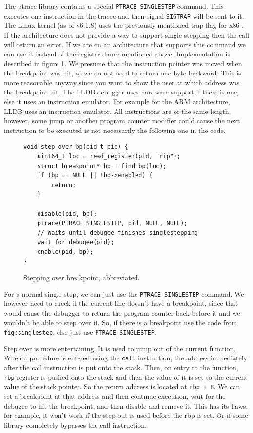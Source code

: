 The ptrace library contains a special \texttt{PTRACE\_SINGLESTEP} command. This
executes one instruction in the tracee and then signal \texttt{SIGTRAP} will be
sent to it. The Linux kernel (as of v6.1.8) uses the previously mentioned trap
flag for x86 \cite{linuxkernel-trapflag}. If the architecture does not provide
a way to support single stepping then the call will return an error. If we are
on an architecture that supports this command we can use it instead of the
register dance mentioned above. Implementation is described in figure
\ref{fig:singlestep}. We presume that the instruction pointer was moved when
the breakpoint was hit, so we do not need to return one byte backward. This is
more reasonable anyway since you want to show the user at which address was the
breakpoint hit. The LLDB \cite{lldb} debugger uses hardware support if there is
one, else it uses an instruction emulator. For example for the ARM
architecture, LLDB uses an instruction emulator. All instructions are of the
same length, however, some jump or another program counter modifier could cause
the next instruction to be executed is not necessarily the following one in the
code.

\begin{figure}\label{fig:singlestep}
    \begin{verbatim}
void step_over_bp(pid_t pid) {
    uint64_t loc = read_register(pid, "rip");
    struct breakpoint* bp = find_bp(loc);
    if (bp == NULL || !bp->enabled) {
        return;
    }

    disable(pid, bp);
    ptrace(PTRACE_SINGLESTEP, pid, NULL, NULL);
    // Waits until debugee finishes singlestepping
    wait_for_debugee(pid);
    enable(pid, bp);
}
    \end{verbatim}
    \caption{Stepping over breakpoint, abbreviated.}
\end{figure}

For a normal single step, we can just use the \texttt{PTRACE\_SINGLESTEP}
command. We however need to check if the current line doesn't have a
breakpoint, since that would cause the debugger to return the program counter
back before it and we wouldn't be able to step over it. So, if there is a
breakpoint use the code from \texttt{fig:singlestep}, else just use
\texttt{PTRACE\_SINGLESTEP}.

Step over is more entertaining. It is used to jump out of the current function.
When a procedure is entered using the \texttt{call} instruction, the address
immediately after the call instruction is put onto the stack. Then, on entry to
the function, \texttt{rbp} register is pushed onto the stack and then the value
of it is set to the current value of the stack pointer. So the return address
is located at \texttt{rbp + 8}. We can set a breakpoint at that address and
then continue execution, wait for the debugee to hit the breakpoint, and then
disable and remove it. This has its flaws, for example, it won't work if the
step out is used before the rbp is set. Or if some library completely bypasses
the call instruction.

